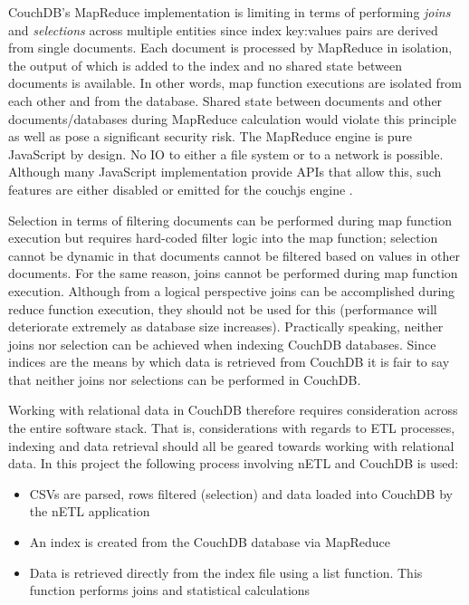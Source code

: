 \label{chapter-analysis}
CouchDB's MapReduce implementation is limiting in terms of performing \textit{joins} and \textit{selections} across multiple entities since index key:values pairs are derived from single documents. Each document is processed by MapReduce in isolation, the output of which is added to the index and no shared state between documents is available. In other words, map function executions are isolated from each other and from the database. Shared state between documents and other documents/databases during MapReduce calculation would violate this principle as well as pose a significant security risk. The MapReduce engine is pure JavaScript by design. No IO to either a file system or to a network is possible. Although many JavaScript implementation provide APIs that allow this, such features are either disabled or emitted for the couchjs engine \cite{slack28Feb}.

Selection in terms of filtering documents can be performed during map function execution but requires hard-coded filter logic into the map function; selection cannot be dynamic in that documents cannot be filtered based on values in other documents. For the same reason, joins cannot be performed during map function execution. Although from a logical perspective joins can be accomplished during reduce function execution, they should not be used for this (performance will deteriorate extremely as database size increases). Practically speaking, neither joins nor selection can be achieved when indexing CouchDB databases. Since indices are the means by which data is retrieved from CouchDB it is fair to say that neither joins nor selections can be performed in CouchDB.

Working with relational data in CouchDB therefore requires consideration across the entire software stack. That is, considerations with regards to ETL processes, indexing and data retrieval should all be geared towards working with relational data. In this project the following process involving nETL and CouchDB is used:

\begin{itemize}
  \item CSVs are parsed, rows filtered (selection) and data loaded into CouchDB by the nETL application
  \item An index is created from the CouchDB database via MapReduce
  \item Data is retrieved directly from the index file using a list function. This function performs joins and statistical calculations
\end{itemize}

